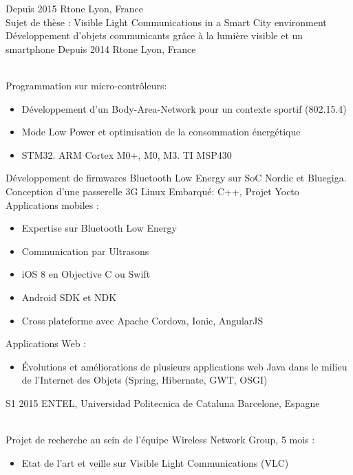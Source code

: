 \documentclass[]{cv-style}          %
\begin{document}
\begin{entrylist}
\entry
  {Depuis 2015}
  {Rtone}
  {Lyon, France}
  {\\
  Sujet de thèse : Visible Light Communications in a Smart City environment\\ 
  Développement d'objets communicants grâce à la lumière visible et un smartphone}
\entry
  {Depuis 2014}
  {Rtone}
  {Lyon, France}
  {\\
  Programmation sur micro-contrôleurs:
  \begin{itemize}
    \item Développement d'un Body-Area-Network pour un contexte sportif (802.15.4)
    \item Mode Low Power et optimisation de la consommation énergétique
    \item STM32. ARM Cortex M0+, M0, M3. TI MSP430
  \end{itemize}
  Développement de firmwares Bluetooth Low Energy sur SoC Nordic et Bluegiga.\\
  Conception d'une passerelle 3G Linux Embarqué: C++, Projet Yocto\\
  Applications mobiles :
  \begin{itemize}
    \item Expertise sur Bluetooth Low Energy
    \item Communication par Ultrasons
    \item iOS 8 en Objective C ou Swift
    \item Android SDK et NDK
    \item Cross plateforme avec Apache Cordova, Ionic, AngularJS
  \end{itemize}
  Applications Web :
  \begin{itemize}
    \item Évolutions et améliorations de plusieurs applications web Java dans le milieu de l'Internet des Objets (Spring, Hibernate, GWT, OSGI)
  \end{itemize}}
 \entry
  {S1 2015 }
  {ENTEL, Universidad Politecnica de Cataluna}
  {Barcelone, Espagne}
  {\\
  Projet de recherche au sein de l'équipe Wireless Network Group, 5 mois :
  \begin{itemize}
    \item Etat de l'art et veille sur Visible Light Communications (VLC)

\end{itemize}}
\end{entrylist}
\end{document}
